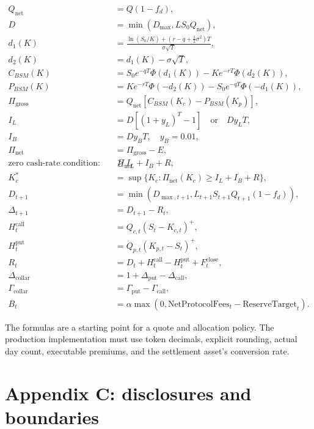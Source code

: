 \documentclass[11pt,oneside]{article}
\newcommand{\PhiN}{\Phi}
\begin{document}
\begin{align*}
Q_{\mathrm{net}}&=Q(1-f_d),\\
D&=\min(D_{\max},L S_0 Q_{\mathrm{net}}),\\
d_1(K)&=\frac{\ln(S_0/K)+(r-q+\tfrac12\sigma^2)T}{\sigma\sqrt{T}},\\
d_2(K)&=d_1(K)-\sigma\sqrt{T},\\
C_{BSM}(K)&=S_0e^{-qT}\PhiN(d_1(K))-Ke^{-rT}\PhiN(d_2(K)),\\
P_{BSM}(K)&=Ke^{-rT}\PhiN(-d_2(K))-S_0e^{-qT}\PhiN(-d_1(K)),\\
\Pi_{\mathrm{gross}}&=Q_{\mathrm{net}}[C_{BSM}(K_c)-P_{BSM}(K_p)],\\
I_L&=D[(1+y_L)^T-1]\quad\text{or}\quad D y_L T,\\
I_B&=D y_B T,\quad y_B=0.01,\\
\Pi_{\mathrm{net}}&=\Pi_{\mathrm{gross}}-E,\\
\text{zero cash-rate condition:}\qquad \Pi_{\mathrm{net}}&\geq I_L+I_B+R,\\
K_c^*&=\sup\{K_c:\Pi_{\mathrm{net}}(K_c)\geq I_L+I_B+R\},\\
D_{t+1}&=\min\left(D_{\max,t+1},L_{t+1}S_{t+1}Q_{t+1}(1-f_d)\right),\\
\Delta_{t+1}&=D_{t+1}-R_t,\\
H_t^{\mathrm{call}}&=Q_{c,t}(S_t-K_{c,t})^+,\\
H_t^{\mathrm{put}}&=Q_{p,t}(K_{p,t}-S_t)^+,\\
R_t&=D_t+H_t^{\mathrm{call}}-H_t^{\mathrm{put}}+F_t^{\mathrm{close}},\\
\Delta_{\mathrm{collar}}&=1+\Delta_{\mathrm{put}}-\Delta_{\mathrm{call}},\\
\Gamma_{\mathrm{collar}}&=\Gamma_{\mathrm{put}}-\Gamma_{\mathrm{call}},\\
B_t&=\alpha\max\left(0,\mathrm{NetProtocolFees}_t-\mathrm{ReserveTarget}_t\right).
\end{align*}

The formulas are a starting point for a quote and allocation policy. The production implementation must use token decimals, explicit rounding, actual day count, executable premiums, and the settlement asset's conversion rate.

\section{Appendix C: disclosures and boundaries}
\end{document}

